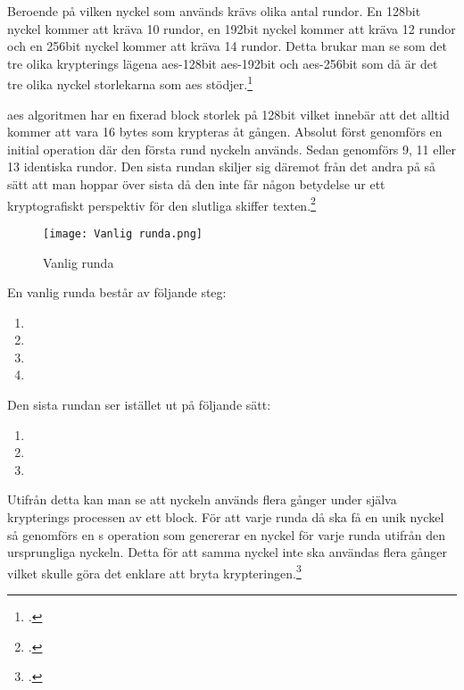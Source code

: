 Beroende på vilken nyckel som används krävs olika antal rundor.
En 128bit nyckel kommer att kräva 10 rundor, en 192bit nyckel kommer att kräva 12 rundor och en 256bit nyckel kommer att kräva 14 rundor.
Detta brukar man se som det tre olika krypterings lägena \acrshort{aes}-128bit \acrshort{aes}-192bit och \acrshort{aes}-256bit som
då är det tre olika nyckel storlekarna som \acrshort{aes} stödjer.\footcite{daemen1999aes}

\acrshort{aes} algoritmen har en fixerad block storlek på 128bit vilket innebär att
det alltid kommer att vara 16 \glspl{byte} som krypteras åt gången. Absolut först genomförs
en initial  operation där den första rund nyckeln används.
Sedan genomförs 9, 11 eller 13 identiska rundor. Den sista rundan skiljer sig däremot från det andra
på så sätt att man hoppar över sista  då den inte får någon betydelse ur ett
kryptografiskt perspektiv för den slutliga skiffer texten.\footcite{daemen1999aes}

\begin{wrapfigure}{r}{0.5\textwidth}
    \centering
    \texttt{[image: Vanlig runda.png]}
    \caption{Vanlig runda}
    \label{fig:round-function}
\end{wrapfigure}

En vanlig runda består av följande steg:

\begin{enumerate}
    \item {}
    \item {}
    \item {}
    \item {}
\end{enumerate}

Den sista rundan ser istället ut på följande sätt:

\begin{enumerate}
    \item {}
    \item {}
    \item {}
\end{enumerate}

Utifrån detta kan man se att nyckeln används flera gånger under själva krypterings processen av ett block.
För att varje runda då ska få en unik nyckel så genomförs en s operation
som genererar en nyckel för varje runda utifrån den ursprungliga nyckeln. Detta för att samma nyckel
inte ska användas flera gånger vilket skulle göra det enklare att bryta krypteringen.\footcite{daemen1999aes}

